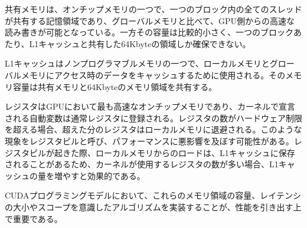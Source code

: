 \documentclass[a4paper,11pt,oneside,openany]{jsbook}
\begin{document}
共有メモリは、オンチップメモリの一つで、一つのブロック内の全てのスレッドが共有する記憶領域であり、グローバルメモリと比べて、GPU側からの高速な読み書きが可能となっている。一方その容量は比較的小さく、一つのブロックあたり、L1キャッシュと共有した64Kbyteの領域しか確保できない。

L1キャッシュはノンプログラマブルメモリの一つで、ローカルメモリとグローバルメモリにアクセス時のデータをキャッシュするために使用される。そのメモリ容量は共有メモリと64Kbyteのメモリ領域を共有する。

レジスタはGPUにおいて最も高速なオンチップメモリであり、カーネルで宣言される自動変数は通常レジスタに登録される。レジスタの数がハードウェア制限を超える場合、超えた分のレジスタはローカルメモリに退避される。このような現象をレジスタピルと呼び、パフォーマンスに悪影響を及ぼす可能性がある。レジスタピルが起きた際、ローカルメモリからのロードは、L1キャッシュに保存されることがあるため、カーネルが使用するレジスタの数が多い場合、L1キャッシュの量を増やすと効果的である。

CUDAプログラミングモデルにおいて、これらのメモリ領域の容量、レイテンシの大小やスコープを意識したアルゴリズムを実装することが、性能を引き出す上で重要である。


\end{document}
